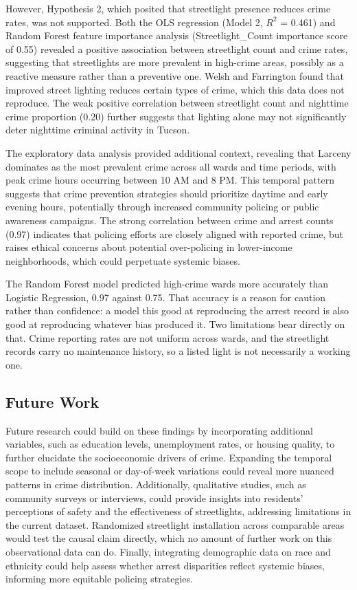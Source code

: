 \documentclass{report}
\begin{document}
\par However, Hypothesis 2, which posited that streetlight presence reduces crime rates, was not supported. Both the OLS regression (Model 2, $R^2$ = 0.461) and Random Forest feature importance analysis (Streetlight\_Count importance score of 0.55) revealed a positive association between streetlight count and crime rates, suggesting that streetlights are more prevalent in high-crime areas, possibly as a reactive measure rather than a preventive one. Welsh and Farrington \cite{welsh08} found that improved street lighting reduces certain types of crime, which this data does not reproduce. The weak positive correlation between streetlight count and nighttime crime proportion (0.20) further suggests that lighting alone may not significantly deter nighttime criminal activity in Tucson.

\par The exploratory data analysis provided additional context, revealing that Larceny dominates as the most prevalent crime across all wards and time periods, with peak crime hours occurring between 10 AM and 8 PM. This temporal pattern suggests that crime prevention strategies should prioritize daytime and early evening hours, potentially through increased community policing or public awareness campaigns. The strong correlation between crime and arrest counts (0.97) indicates that policing efforts are closely aligned with reported crime, but raises ethical concerns about potential over-policing in lower-income neighborhoods, which could perpetuate systemic biases.

\par The Random Forest model predicted high-crime wards more accurately than Logistic Regression, 0.97 against 0.75. That accuracy is a reason for caution rather than confidence: a model this good at reproducing the arrest record is also good at reproducing whatever bias produced it. Two limitations bear directly on that. Crime reporting rates are not uniform across wards, and the streetlight records carry no maintenance history, so a listed light is not necessarily a working one.

\subsection{Future Work}
\par Future research could build on these findings by incorporating additional variables, such as education levels, unemployment rates, or housing quality, to further elucidate the socioeconomic drivers of crime. Expanding the temporal scope to include seasonal or day-of-week variations could reveal more nuanced patterns in crime distribution. Additionally, qualitative studies, such as community surveys or interviews, could provide insights into residents' perceptions of safety and the effectiveness of streetlights, addressing limitations in the current dataset. Randomized streetlight installation across comparable areas would test the causal claim directly, which no amount of further work on this observational data can do. Finally, integrating demographic data on race and ethnicity could help assess whether arrest disparities reflect systemic biases, informing more equitable policing strategies.
\end{document}
